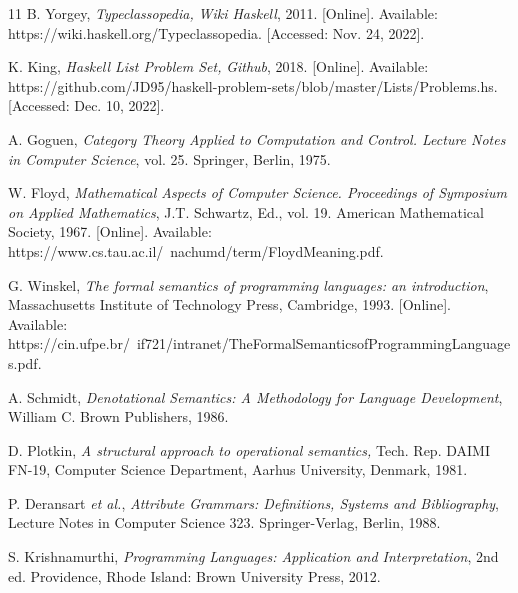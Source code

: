 \begin{thebibliography}{11}
    \label{sec:18}
    \hypertarget{18}{}
    B. Yorgey, \textit{Typeclassopedia, }\textit{Wiki Haskell}, 2011. [Online]. Available: https://wiki.haskell.org/Typeclassopedia. [Accessed: Nov. 24, 2022].

    \label{sec:19}
    \hypertarget{19}{}
    K. King, \textit{Haskell List Problem Set, }\textit{Github}, 2018. [Online]. Available: https://github.com/JD95/haskell-problem-sets/blob/master/Lists/Problems.hs. [Accessed: Dec. 10, 2022].

    \label{sec:20}
    \hypertarget{20}{}
    A. Goguen, \textit{Category Theory Applied to Computation and Control. Lecture Notes in Computer Science}, vol. 25. Springer, Berlin, 1975.

    \label{sec:21}
    \hypertarget{21}{}
    W. Floyd, \textit{Mathematical Aspects of Computer Science. Proceedings of Symposium on Applied Mathematics}, J.T. Schwartz, Ed., vol. 19. American Mathematical Society, 1967. [Online]. Available: https://www.cs.tau.ac.il/~nachumd/term/FloydMeaning.pdf.

    \label{sec:22}
    \hypertarget{22}{}
    G. Winskel, \textit{The formal semantics of programming languages: an introduction}, Massachusetts Institute of Technology Press, Cambridge, 1993. [Online]. Available: https://cin.ufpe.br/~if721/intranet/TheFormalSemanticsofProgrammingLanguages.pdf.


    \label{sec:23}
    \hypertarget{23}{}
    A. Schmidt, \textit{Denotational Semantics: A Methodology for Language Development}, William C. Brown Publishers, 1986.

    \label{sec:24}
    \hypertarget{24}{}
    D. Plotkin, \textit{A structural approach to operational semantics, }Tech. Rep. DAIMI FN-19, Computer Science Department, Aarhus University, Denmark, 1981.
    
    \label{sec:25}
    \hypertarget{25}{}
    P. Deransart \textit{et al.}, \textit{Attribute Grammars: Definitions, Systems and Bibliography}, Lecture Notes in Computer Science 323. Springer-Verlag, Berlin, 1988.

    \label{sec:26}
    \hypertarget{26}{}
    S. Krishnamurthi, \textit{Programming Languages: Application and Interpretation}, 2nd ed. Providence, Rhode Island: Brown University Press, 2012.


\end{thebibliography}
